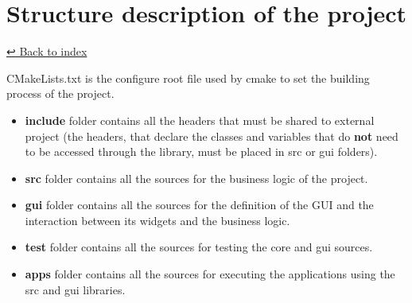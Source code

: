 \documentclass[
]{article}
\author{}
\date{}
\begin{document}
\hypertarget{header-n0}{%
\section{Structure description of the project}\label{header-n0}}

\href{../home}{↩️ Back to index}

CMakeLists.txt is the configure root file used by cmake to set the
building process of the project.

\begin{itemize}
\item
  \textbf{include} folder contains all the headers that must be shared
  to external project (the headers, that declare the classes and
  variables that do \textbf{not} need to be accessed through the
  library, must be placed in src or gui folders).
\end{itemize}

\begin{itemize}
\item
  \textbf{src} folder contains all the sources for the business logic of
  the project.
\end{itemize}

\begin{itemize}
\item
  \textbf{gui} folder contains all the sources for the definition of the
  GUI and the interaction between its widgets and the business logic.
\end{itemize}

\begin{itemize}
\item
  \textbf{test} folder contains all the sources for testing the core and
  gui sources.
\end{itemize}

\begin{itemize}
\item
  \textbf{apps} folder contains all the sources for executing the
  applications using the src and gui libraries.
\end{itemize}
\end{document}
